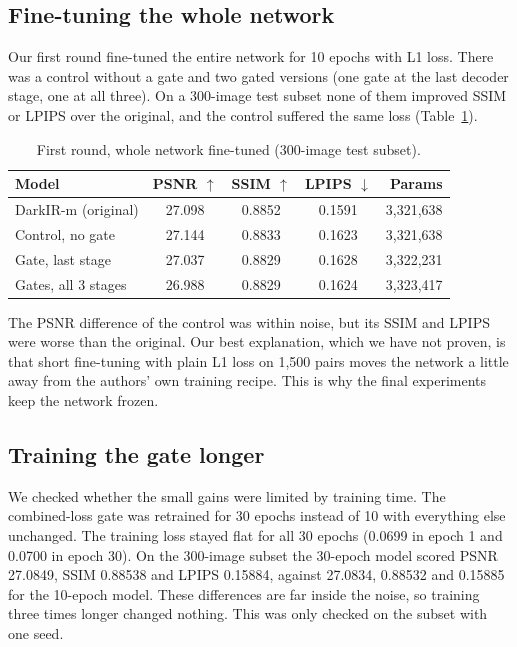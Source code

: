 \documentclass[conference]{IEEEtran}
\begin{document}
\subsection{Fine-tuning the whole network}
Our first round fine-tuned the entire network for 10 epochs with L1 loss. There was a control without a gate and two gated versions (one gate at the last decoder stage, one at all three). On a 300-image test subset none of them improved SSIM or LPIPS over the original, and the control suffered the same loss (Table~\ref{tab:first}).

\begin{table}[t]
\caption{First round, whole network fine-tuned (300-image test subset).}
\label{tab:first}
\centering
\footnotesize
\setlength{\tabcolsep}{3pt}
\begin{tabular}{lcccr}
\toprule
Model & PSNR $\uparrow$ & SSIM $\uparrow$ & LPIPS $\downarrow$ & Params \\
\midrule
DarkIR-m (original) & 27.098 & 0.8852 & 0.1591 & 3,321,638 \\
Control, no gate & 27.144 & 0.8833 & 0.1623 & 3,321,638 \\
Gate, last stage & 27.037 & 0.8829 & 0.1628 & 3,322,231 \\
Gates, all 3 stages & 26.988 & 0.8829 & 0.1624 & 3,323,417 \\
\bottomrule
\end{tabular}
\end{table}

The PSNR difference of the control was within noise, but its SSIM and LPIPS were worse than the original. Our best explanation, which we have not proven, is that short fine-tuning with plain L1 loss on 1{,}500 pairs moves the network a little away from the authors' own training recipe. This is why the final experiments keep the network frozen.

\subsection{Training the gate longer}
We checked whether the small gains were limited by training time. The combined-loss gate was retrained for 30 epochs instead of 10 with everything else unchanged. The training loss stayed flat for all 30 epochs (0.0699 in epoch 1 and 0.0700 in epoch 30). On the 300-image subset the 30-epoch model scored PSNR 27.0849, SSIM 0.88538 and LPIPS 0.15884, against 27.0834, 0.88532 and 0.15885 for the 10-epoch model. These differences are far inside the noise, so training three times longer changed nothing. This was only checked on the subset with one seed.
\end{document}
